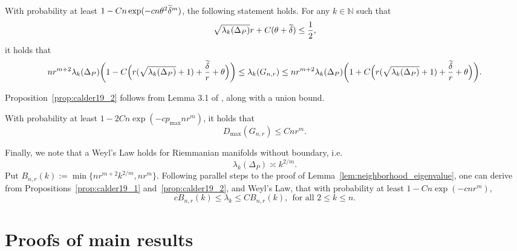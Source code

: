 \begin{proposition}
	\label{prop:calder19_1}
	With probability at least $1 - Cn\exp(-cn\theta^2\widetilde{\delta}^m)$, the following statement holds. For any $k \in \mathbb{N}$ such that
	\begin{equation*}
	\sqrt{\lambda_k(\Delta_P)}r + C(\theta + \widetilde{\delta}) \leq \frac{1}{2},
	\end{equation*} 
	it holds that
	\begin{equation*}
	nr^{m+2} \lambda_k(\Delta_P) \biggl(1 - C\Bigl(r(\sqrt{\lambda_k(\Delta_P)} + 1) + \frac{\widetilde{\delta}}{r} + \theta\Bigr)\biggr)\leq \lambda_k(G_{n,r}) \leq nr^{m+2} \lambda_k(\Delta_P) \biggl(1 + C\Bigl(r(\sqrt{\lambda_k(\Delta_P)} + 1) + \frac{\widetilde{\delta}}{r} + \theta\Bigr)\biggr).
	\end{equation*}
\end{proposition}

Proposition~\ref{prop:calder19_2} follows from Lemma 3.1 of \citet{calder2019}, along with a union bound.
\begin{proposition}
	\label{prop:calder19_2}
	With probability at least $1 - 2Cn\exp(-cp_{\max}nr^m)$, it holds that
	\begin{equation*}
	D_{\max}(G_{n,r}) \leq Cnr^{m}.
	\end{equation*}
\end{proposition}

Finally, we note that a Weyl's Law holds for Riemmanian manifolds without boundary, i.e.
\begin{equation*}
\lambda_k(\Delta_P) \asymp k^{2/m}.
\end{equation*}
Put $B_{n,r}(k) := \min\{nr^{m + 2}k^{2/m}, nr^m\}$. Following parallel steps to the proof of Lemma~\ref{lem:neighborhood_eigenvalue}, one can derive from Propositions~\ref{prop:calder19_1} and~\ref{prop:calder19_2}, and Weyl's Law, that with probability at least $1 - Cn\exp(-cnr^m)$, 
\begin{equation}
\label{eqn:neighborhood_eigenvalue_manifold}
cB_{n,r}(k) \leq \lambda_k \leq CB_{n,r}(k),~~\textrm{for all $2 \leq k \leq n$}.
\end{equation}

\section{Proofs of main results}
\label{sec:main_results}

